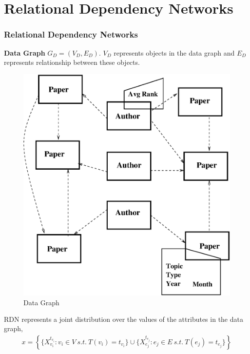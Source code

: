 \documentclass[10pt, blue,subsection=true, compress]{beamer}
\begin{document}
\section{Relational Dependency Networks}
\begin{frame}\frametitle{Relational Dependency Networks}
\textbf{Data Graph}
$G_D = (V_D , E_D)$. $V_D$ represents objects in the data graph and $E_D$ represents relationship between these objects.
\begin{figure}[htbp]
\centering
\includegraphics[scale=0.2]{img/data.eps}
\caption{Data Graph}
\label{fig:3.2}
\end{figure}
RDN represents a joint distribution over the values of the attributes in the data graph, 
\begin{align}
\nonumber  x = \left\{\{X_{v_i}^{t_{v_i}} : v_i \in V~ s.t. ~T(v_i) = t_{v_i}\}  \cup \{X_{e_j}^{t_{e_j}} : e_j \in E ~s.t.~ T(e_j) = t_{e_j} \}\right\}
\end{align}



\end{frame}
\end{document}
